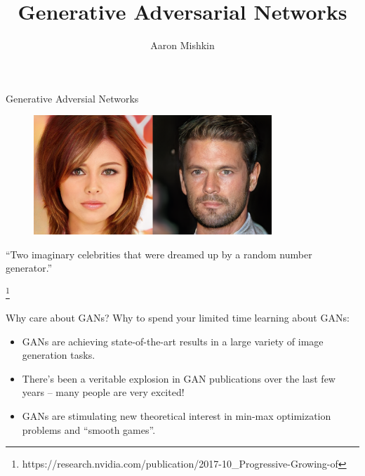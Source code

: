 \documentclass[notheorems]{beamer}
\title{Generative Adversarial Networks}
\author{Aaron Mishkin}
\institute{UBC MLRG 2018W2}
\date{}
\newcommand{\source}[1]{{\let\thefootnote\relax\footnote{{\tiny #1}}}}
\begin{document}
    \begin{frame}

        \titlepage

    \end{frame}

    \begin{frame}{Generative Adversial Networks}

        \hspace{0.25cm}

        \begin{figure}
            \centering
            \includegraphics[width=0.8\textwidth]{figures/two_celebs}
        \end{figure}

        \begin{center}
            ``Two imaginary celebrities that were dreamed up by a random number generator.''
        \end{center}

        \source{https://research.nvidia.com/publication/2017-10\_Progressive-Growing-of}
    \end{frame}

    \begin{frame}{Why care about GANs?}
    Why to spend your limited time learning about GANs:
    \begin{itemize}
        \item GANs are achieving state-of-the-art results in a large variety of image generation tasks.
        \item There's been a veritable explosion in GAN publications over the last few years -- many people are very excited!
        \item GANs are stimulating new theoretical interest in min-max optimization problems and ``smooth games''.
    \end{itemize}

    \end{frame}
\end{document}

